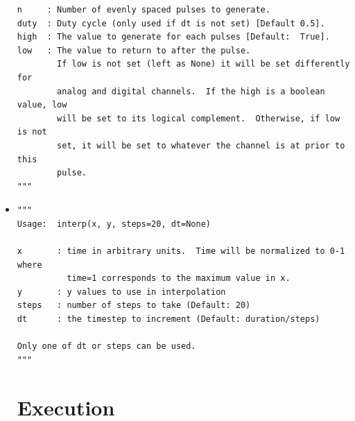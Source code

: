 \begin{itemize}
\begin{lstlisting}
n     : Number of evenly spaced pulses to generate.
duty  : Duty cycle (only used if dt is not set) [Default 0.5].
high  : The value to generate for each pulses [Default:  True].
low   : The value to return to after the pulse.
        If low is not set (left as None) it will be set differently for
        analog and digital channels.  If the high is a boolean value, low
        will be set to its logical complement.  Otherwise, if low is not
        set, it will be set to whatever the channel is at prior to this
        pulse.
"""
\end{lstlisting}

\item {}
\begin{lstlisting}
"""
Usage:  interp(x, y, steps=20, dt=None)

x       : time in arbitrary units.  Time will be normalized to 0-1 where
          time=1 corresponds to the maximum value in x.
y       : y values to use in interpolation
steps   : number of steps to take (Default: 20)
dt      : the timestep to increment (Default: duration/steps)

Only one of dt or steps can be used.
"""
\end{lstlisting}


\section{Execution}\label{sec:waveforms:exec}

\end{itemize}
